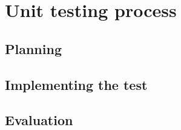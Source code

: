 \section{Unit testing process}

\subsection{Planning}

\subsection{Implementing the test}

\subsection{Evaluation}